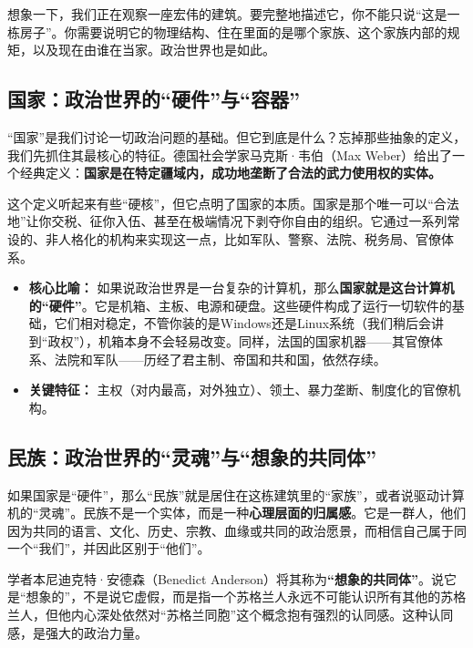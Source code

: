 \documentclass[a5paper, 11pt, openany]{ctexbook}
\begin{document}
想象一下，我们正在观察一座宏伟的建筑。要完整地描述它，你不能只说“这是一栋房子”。你需要说明它的物理结构、住在里面的是哪个家族、这个家族内部的规矩，以及现在由谁在当家。政治世界也是如此。

\subsection{国家：政治世界的“硬件”与“容器”}

“国家”是我们讨论一切政治问题的基础。但它到底是什么？忘掉那些抽象的定义，我们先抓住其最核心的特征。德国社会学家马克斯·韦伯（Max Weber）给出了一个经典定义：\textbf{国家是在特定疆域内，成功地垄断了合法的武力使用权的实体。}

这个定义听起来有些“硬核”，但它点明了国家的本质。国家是那个唯一可以“合法地”让你交税、征你入伍、甚至在极端情况下剥夺你自由的组织。它通过一系列常设的、非人格化的机构来实现这一点，比如军队、警察、法院、税务局、官僚体系。

\begin{itemize}
    \item \textbf{核心比喻：} 如果说政治世界是一台复杂的计算机，那么\textbf{国家就是这台计算机的“硬件”}。它是机箱、主板、电源和硬盘。这些硬件构成了运行一切软件的基础，它们相对稳定，不管你装的是Windows还是Linux系统（我们稍后会讲到“政权”），机箱本身不会轻易改变。同样，法国的国家机器——其官僚体系、法院和军队——历经了君主制、帝国和共和国，依然存续。
    \item \textbf{关键特征：} 主权（对内最高，对外独立）、领土、暴力垄断、制度化的官僚机构。
\end{itemize}

\subsection{民族：政治世界的“灵魂”与“想象的共同体”}

如果国家是“硬件”，那么“民族”就是居住在这栋建筑里的“家族”，或者说驱动计算机的“灵魂”。民族不是一个实体，而是一种\textbf{心理层面的归属感}。它是一群人，他们因为共同的语言、文化、历史、宗教、血缘或共同的政治愿景，而相信自己属于同一个“我们”，并因此区别于“他们”。

学者本尼迪克特·安德森（Benedict Anderson）将其称为\textbf{“想象的共同体”}。说它是“想象的”，不是说它虚假，而是指一个苏格兰人永远不可能认识所有其他的苏格兰人，但他内心深处依然对“苏格兰同胞”这个概念抱有强烈的认同感。这种认同感，是强大的政治力量。
\end{document}
